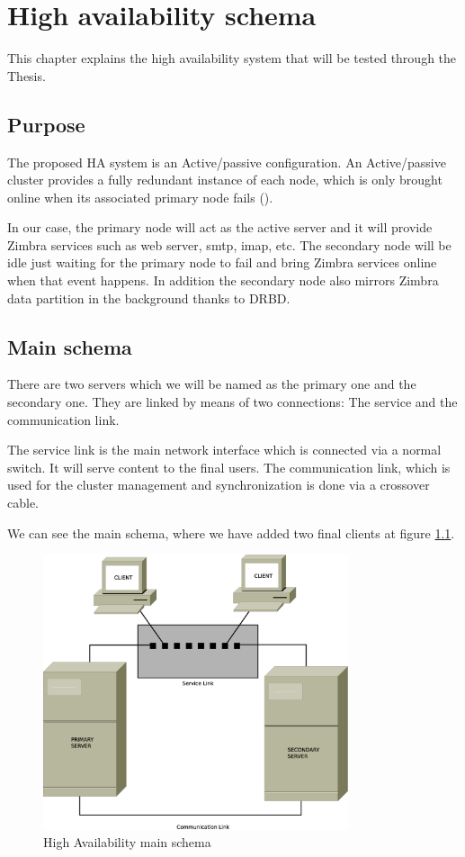 

\chapter{High availability schema}
\label{chap:ha-schema}
This chapter explains the high availability system that will be tested through the Thesis. 

\section {Purpose}
The proposed HA system is an Active/passive configuration. An Active/passive cluster provides a fully redundant instance of each node, which is only brought online when its associated primary node fails (\cite{HAClusterNodeConfigurations}).

In our case, the primary node will act as the active server and it will provide Zimbra services such as web server, smtp, imap, etc. The secondary node will be idle just waiting for the primary node to fail and bring Zimbra services online when that event happens. In addition the secondary node also mirrors Zimbra data partition in the background thanks to DRBD.

\section {Main schema}
There are two servers which we will be named as the primary one and the secondary one. They are linked by means of two connections: The service and the communication link.

The service link is the main network interface which is connected via a normal switch. It will serve content to the final users. The communication link, which is used for the cluster management and synchronization is done via a crossover cable.

We can see the main schema, where we have added two final clients at figure \ref{fig:main-schema}.

\begin{figure}
  \centering
    \includegraphics[width=0.8\textwidth]{img/ha_main_schema.eps}
  \caption{High Availability main schema}
  \label{fig:main-schema}
\end{figure}

